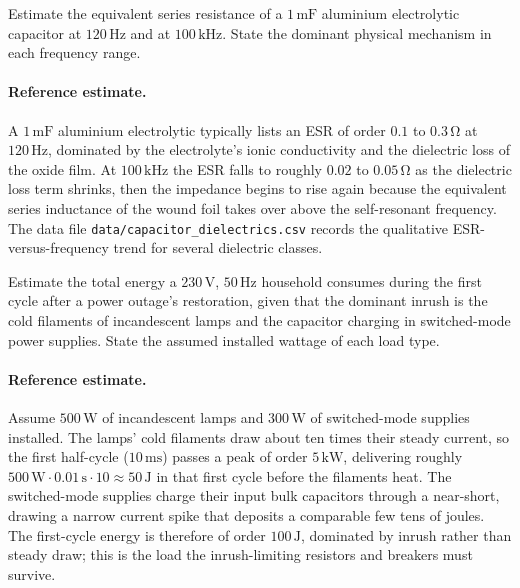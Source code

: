 \begin{exercise}
Estimate the equivalent series resistance of a $1\,\si{\milli\farad}$
aluminium electrolytic capacitor at $120\,\si{\hertz}$ and at
$100\,\si{\kilo\hertz}$. State the dominant physical mechanism in
each frequency range.
\paragraph{Reference estimate.}
A $1\,\si{\milli\farad}$ aluminium electrolytic typically lists an ESR
of order $0.1$ to $0.3\,\si{\ohm}$ at $120\,\si{\hertz}$, dominated by
the electrolyte's ionic conductivity and the dielectric loss of the
oxide film. At $100\,\si{\kilo\hertz}$ the ESR falls to roughly
$0.02$ to $0.05\,\si{\ohm}$ as the dielectric loss term shrinks, then
the impedance begins to rise again because the equivalent series
inductance of the wound foil takes over above the self-resonant
frequency. The data file \texttt{data/capacitor\_dielectrics.csv}
records the qualitative ESR-versus-frequency trend for several
dielectric classes.
\end{exercise}

\begin{exercise}
Estimate the total energy a $230\,\si{\volt}$, $50\,\si{\hertz}$
household consumes during the first cycle after a power outage's
restoration, given that the dominant inrush is the cold filaments of
incandescent lamps and the capacitor charging in switched-mode power
supplies. State the assumed installed wattage of each load type.
\paragraph{Reference estimate.}
Assume $500\,\si{\watt}$ of incandescent lamps and $300\,\si{\watt}$ of
switched-mode supplies installed. The lamps' cold filaments draw about
ten times their steady current, so the first half-cycle
($10\,\si{\milli\second}$) passes a peak of order
$5\,\si{\kilo\watt}$, delivering roughly $500\,\text{W}\cdot 0.01\,
\text{s}\cdot 10 \approx 50\,\si{\joule}$ in that first cycle before the
filaments heat. The switched-mode supplies charge their input bulk
capacitors through a near-short, drawing a narrow current spike that
deposits a comparable few tens of joules. The first-cycle energy is
therefore of order $100\,\si{\joule}$, dominated by inrush rather than
steady draw; this is the load the inrush-limiting resistors and
breakers must survive.
\end{exercise}

